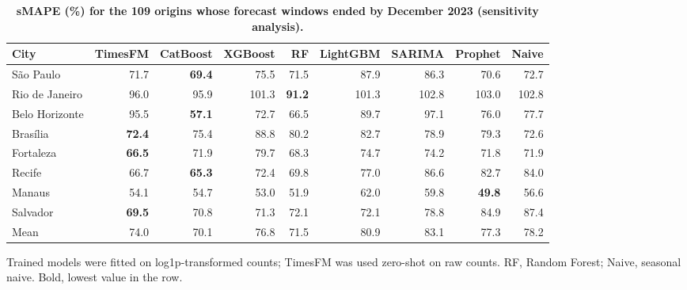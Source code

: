 
\begin{table}[!ht]
\centering
\small
\caption{\textbf{sMAPE (\%) for the 109 origins whose forecast windows ended by December 2023 (sensitivity analysis).}}
\begin{tabular}{lrrrrrrrr}
\toprule
City & TimesFM & CatBoost & XGBoost & RF & LightGBM & SARIMA & Prophet & Naive \\
\midrule
S\~ao Paulo & 71.7 & \textbf{69.4} & 75.5 & 71.5 & 87.9 & 86.3 & 70.6 & 72.7 \\
Rio de Janeiro & 96.0 & 95.9 & 101.3 & \textbf{91.2} & 101.3 & 102.8 & 103.0 & 102.8 \\
Belo Horizonte & 95.5 & \textbf{57.1} & 72.7 & 66.5 & 89.7 & 97.1 & 76.0 & 77.7 \\
Bras\'ilia & \textbf{72.4} & 75.4 & 88.8 & 80.2 & 82.7 & 78.9 & 79.3 & 72.6 \\
Fortaleza & \textbf{66.5} & 71.9 & 79.7 & 68.3 & 74.7 & 74.2 & 71.8 & 71.9 \\
Recife & 66.7 & \textbf{65.3} & 72.4 & 69.8 & 77.0 & 86.6 & 82.7 & 84.0 \\
Manaus & 54.1 & 54.7 & 53.0 & 51.9 & 62.0 & 59.8 & \textbf{49.8} & 56.6 \\
Salvador & \textbf{69.5} & 70.8 & 71.3 & 72.1 & 72.1 & 78.8 & 84.9 & 87.4 \\
\midrule
Mean & 74.0 & 70.1 & 76.8 & 71.5 & 80.9 & 83.1 & 77.3 & 78.2 \\
\bottomrule
\end{tabular}
\begin{flushleft} Trained models were fitted on log1p-transformed counts; TimesFM was used zero-shot on raw counts. RF, Random Forest; Naive, seasonal naive. Bold, lowest value in the row.
\end{flushleft}
\label{tabE}
\end{table}
